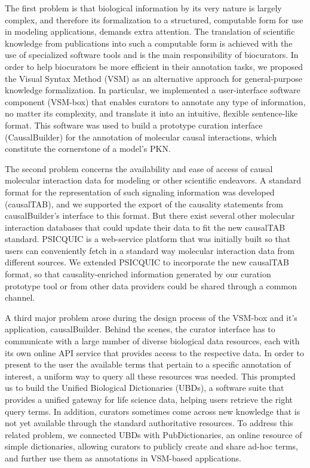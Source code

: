 \documentclass[
  12pt,
]{book}
\begin{document}
The first problem is that biological information by its very nature is largely complex, and therefore its formalization to a structured, computable form for use in modeling applications, demands extra attention. The translation of scientific knowledge from publications into such a computable form is achieved with the use of specialized software tools and is the main responsibility of biocurators. In order to help biocurators be more efficient in their annotation tasks, we proposed the Visual Syntax Method (VSM) as an alternative approach for general-purpose knowledge formalization. In particular, we implemented a user-interface software component (VSM-box) that enables curators to annotate any type of information, no matter its complexity, and translate it into an intuitive, flexible sentence-like format. This software was used to build a prototype curation interface (CausalBuilder) for the annotation of molecular causal interactions, which constitute the cornerstone of a model's PKN.

The second problem concerns the availability and ease of access of causal molecular interaction data for modeling or other scientific endeavors. A standard format for the representation of such signaling information was developed (causalTAB), and we supported the export of the causality statements from causalBuilder's interface to this format. But there exist several other molecular interaction databases that could update their data to fit the new causalTAB standard. PSICQUIC is a web-service platform that was initially built so that users can conveniently fetch in a standard way molecular interaction data from different sources. We extended PSICQUIC to incorporate the new causalTAB format, so that causality-enriched information generated by our curation prototype tool or from other data providers could be shared through a common channel.

A third major problem arose during the design process of the VSM-box and it's application, causalBuilder. Behind the scenes, the curator interface has to communicate with a large number of diverse biological data resources, each with its own online API service that provides access to the respective data. In order to present to the user the available terms that pertain to a specific annotation of interest, a uniform way to query all these resources was needed. This prompted us to build the Unified Biological Dictionaries (UBDs), a software suite that provides a unified gateway for life science data, helping users retrieve the right query terms. In addition, curators sometimes come across new knowledge that is not yet available through the standard authoritative resources. To address this related problem, we connected UBDs with PubDictionaries, an online resource of simple dictionaries, allowing curators to publicly create and share ad-hoc terms, and further use them as annotations in VSM-based applications.
\end{document}
